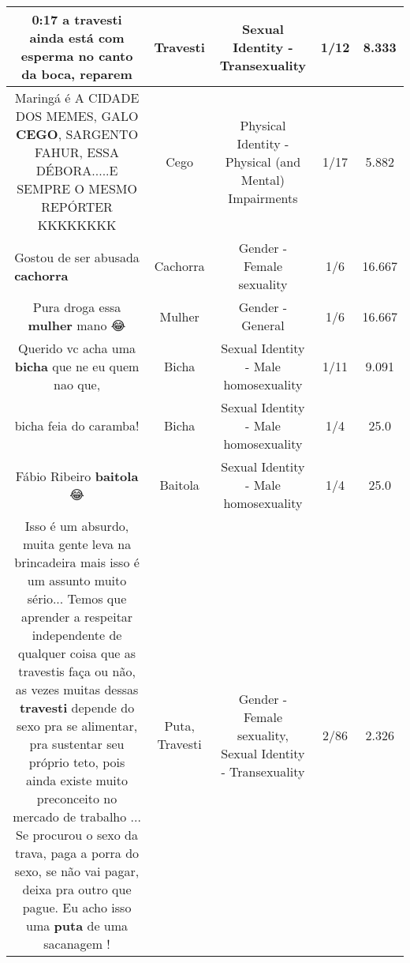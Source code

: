 \documentclass[11pt]{article}
\newlength\mylength
\begin{document}
\begin{center}
\begin{longtable}{|C{.65\mylength}|C{.30\mylength}|C{.12\mylength}|C{.12\mylength}|C{.12\mylength}|}
  \small 0:17 a \textbf{travesti} ainda está com esperma no canto da boca, reparem\normalsize   & Travesti & Sexual Identity - Transexuality & 1/12 & 8.333 \\  \hline
  \small Maringá é A CIDADE DOS MEMES, GALO \textbf{CEGO}, SARGENTO FAHUR, ESSA DÉBORA.....E SEMPRE O MESMO REPÓRTER KKKKKKKK\normalsize   & Cego & Physical Identity - Physical (and Mental) Impairments & 1/17 & 5.882 \\  \hline
  \small Gostou de ser abusada \textbf{cachorra} 🤣🤣🤣🤣🤣🤣🤣🤣🤣🤣🤣🤣🤣🤣🤣🤣🤣🤣🤣\normalsize   & Cachorra & Gender - Female sexuality & 1/6 & 16.667 \\  \hline
  \small Pura droga essa \textbf{mulher} mano 😂\normalsize   & Mulher & Gender - General & 1/6 & 16.667 \\  \hline
  \small Querido vc acha uma \textbf{bicha} que ne eu quem nao que,\normalsize   & Bicha & Sexual Identity - Male homosexuality & 1/11 & 9.091 \\  \hline
  \small bicha feia do caramba!\normalsize   & Bicha & Sexual Identity - Male homosexuality & 1/4 & 25.0 \\  \hline
  \small Fábio Ribeiro \textbf{baitola} 😂\normalsize   & Baitola & Sexual Identity - Male homosexuality & 1/4 & 25.0 \\  \hline
  \small Isso é um absurdo, muita gente leva na brincadeira mais isso é um assunto muito sério... Temos que aprender a respeitar independente de qualquer coisa que as travestis faça ou não, as vezes muitas dessas \textbf{travesti} depende do sexo pra se alimentar, pra sustentar seu próprio teto, pois ainda existe muito preconceito no mercado de trabalho ...  Se procurou o sexo da trava, paga a porra do sexo, se não vai pagar, deixa pra outro que pague. Eu acho isso uma \textbf{puta} de uma sacanagem !\normalsize   & Puta, Travesti & Gender - Female sexuality, Sexual Identity - Transexuality & 2/86 & 2.326 \\  \hline

\end{longtable}
\end{center}
\end{document}
